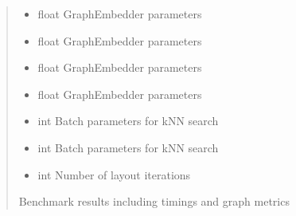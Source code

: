 \documentclass[letterpaper,10pt,english]{sphinxmanual}
\begin{document}
\begin{fulllineitems}
\begin{quote}
\begin{description}
\begin{itemize}
\item {} 
\sphinxAtStartPar
{} \textendash{} float
GraphEmbedder parameters

\item {} 
\sphinxAtStartPar
{} \textendash{} float
GraphEmbedder parameters

\item {} 
\sphinxAtStartPar
{} \textendash{} float
GraphEmbedder parameters

\item {} 
\sphinxAtStartPar
{} \textendash{} float
GraphEmbedder parameters

\item {} 
\sphinxAtStartPar
{} \textendash{} int
Batch parameters for kNN search

\item {} 
\sphinxAtStartPar
{} \textendash{} int
Batch parameters for kNN search

\item {} 
\sphinxAtStartPar
{} \textendash{} int
Number of layout iterations

\end{itemize}

\sphinxAtStartPar
Benchmark results including timings and graph metrics

\sphinxAtStartPar
{}

\end{description}\end{quote}

\end{fulllineitems}

\end{document}
